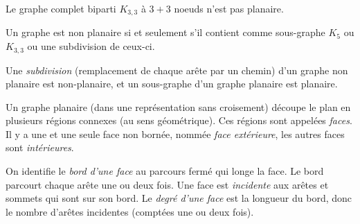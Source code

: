 \begin{mytheo}
Le graphe complet biparti $K_{3,3}$ à $3+3$ noeuds n'est pas planaire.
\end{mytheo}



\begin{mytheo} [Kuratowski]
  Un graphe est non planaire si et seulement s'il contient comme sous-graphe $K_5$ ou $K_{3,3}$ ou une subdivision de ceux-ci.
\end{mytheo}


\begin{mydef}
  Une \emph{subdivision} (remplacement de chaque arête par un chemin) d'un graphe non planaire est non-planaire, et un sous-graphe d'un graphe planaire est planaire.
\end{mydef}

\begin{mydef}
  Un graphe planaire (dans une représentation sans croisement) découpe le plan en plusieurs régions connexes (au sens géométrique). Ces régions sont appelées \emph{faces}. Il y a une et une seule face non bornée, nommée \emph{face extérieure}, les autres faces sont \emph{intérieures}.
\end{mydef}

\begin{mydef}
  On identifie le \emph{bord d'une face} au parcours fermé qui longe la face. Le bord parcourt chaque arête une ou deux fois. 
  Une face est \emph{incidente} aux arêtes et sommets qui sont sur son bord.
  Le \emph{degré d'une face} est la longueur du bord, donc le nombre d'arêtes incidentes (comptées une ou deux fois).
\end{mydef}

